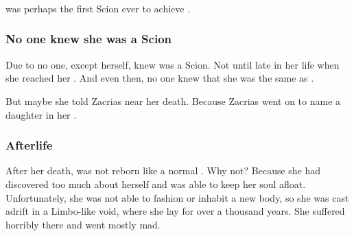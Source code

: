 \subsubsection{\Apotheosis}
\Belzir{} was perhaps the first Scion ever to achieve . 




\subsubsection{No one knew she was a Scion}
Due to  no one, except \Belzir{} herself, knew \Belzir{} was a Scion. 
Not until late in her life when she reached her \Apotheosis. 
And even then, no one knew that she was the same as \Delphine. 

But maybe she told Zacrias near her death. 
Because Zacrias went on to name a daughter \quo{\Delphine} in her \honour. 





\subsubsection{Afterlife}
After her death, \Belzir{} was not reborn like a normal \Malach. Why not? Because she had discovered too much about herself and was able to keep her soul afloat. Unfortunately, she was not able to fashion or inhabit a new body, so she was cast adrift in a Limbo-like void, where she lay for over a thousand years. She suffered horribly there and went mostly mad.


